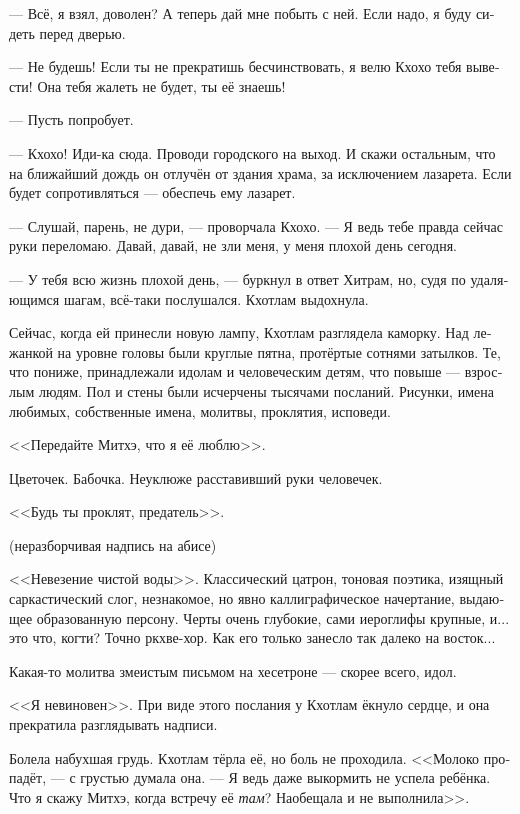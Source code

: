 \documentclass[a4paper,12pt,fleqn]{book}\usepackage{cooltooltips}\usepackage{polyglossia}\setdefaultlanguage{russian}\setotherlanguage{english}\defaultfontfeatures{Ligatures=TeX,Mapping=tex-text} \usepackage{xcolor}\definecolor{lightgray}{HTML}{bbbbbb}\color{lightgray}\newcommand{\ml}[3]{\textenglish{\textcolor{black}{#3}}}
\newcommand{\asterism}{\vspace{1em}{\centering\Large\bfseries$\ast~\ast~\ast$\par}\vspace{1em}}
\begin{document}
--- Всё, я взял, доволен?
А теперь дай мне побыть с ней.
Если надо, я буду сидеть перед дверью.

--- Не будешь!
Если ты не прекратишь бесчинствовать, я велю Кхохо тебя вывести!
Она тебя жалеть не будет, ты её знаешь!

--- Пусть попробует.

--- Кхохо!
Иди-ка сюда.
Проводи городского на выход.
И скажи остальным, что на ближайший дождь он отлучён от здания храма, за исключением лазарета.
Если будет сопротивляться --- обеспечь ему лазарет.

--- Слушай, парень, не дури, --- проворчала Кхохо.
--- Я ведь тебе правда сейчас руки переломаю.
Давай, давай, не зли меня, у меня плохой день сегодня.

--- У тебя всю жизнь плохой день, --- буркнул в ответ Хитрам, но, судя по удаляющимся шагам, всё-таки послушался.
Кхотлам выдохнула.

\asterism

Сейчас, когда ей принесли новую лампу, Кхотлам разглядела каморку.
Над лежанкой на уровне головы были круглые пятна, протёртые сотнями затылков.
Те, что пониже, принадлежали идолам и человеческим детям, что повыше --- взрослым людям.
Пол и стены были исчерчены тысячами посланий.
Рисунки, имена любимых, собственные имена, молитвы, проклятия, исповеди.

<<Передайте Митхэ, что я её люблю>>.

Цветочек.
Бабочка.
Неуклюже расставивший руки человечек.

<<Будь ты проклят, предатель>>.

(неразборчивая надпись на абисе)

<<Невезение чистой воды>>.
Классический цатрон, тоновая поэтика, изящный саркастический слог, незнакомое, но явно каллиграфическое начертание, выдающее образованную персону.
Черты очень глубокие, сами иероглифы крупные, и... это что, когти?
Точно ркхве-хор.
Как его только занесло так далеко на восток...

Какая-то молитва змеистым письмом на хесетроне --- скорее всего, идол.

<<Я невиновен>>.
При виде этого послания у Кхотлам ёкнуло сердце, и она прекратила разглядывать надписи.

Болела набухшая грудь.
Кхотлам тёрла её, но боль не проходила.
<<Молоко пропадёт, --- с грустью думала она.
--- Я ведь даже выкормить не успела ребёнка.
Что я скажу Митхэ, когда встречу её \emph{там}?
Наобещала и не выполнила>>.
\end{document}
